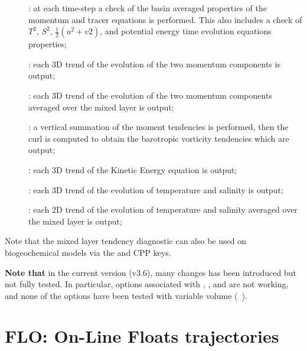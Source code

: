\documentclass[../main/NEMO_manual]{subfiles}
\begin{document}
\begin{description}
\item [{}]: at each  time-step a check of the basin averaged properties of
  the momentum and tracer equations is performed.
  This also includes a check of $T^2$, $S^2$, $\tfrac{1}{2} (u^2+v2)$,
  and potential energy time evolution equations properties;
\item [{}]: each 3D trend of the evolution of the two momentum components is output;
\item [{}]: each 3D trend of the evolution of the two momentum components averaged over the mixed layer is output;
\item [{}]: a vertical summation of the moment tendencies is performed,
  then the curl is computed to obtain the barotropic vorticity tendencies which are output;
\item [{}]  : each 3D trend of the Kinetic Energy equation is output;
\item [{}]: each 3D trend of the evolution of temperature and salinity is output;
\item [{}]: each 2D trend of the evolution of temperature and salinity averaged over the mixed layer is output;
\end{description}

Note that the mixed layer tendency diagnostic can also be used on biogeochemical models via
the  and  CPP keys.

\textbf{Note that} in the current version (v3.6), many changes has been introduced but not fully tested.
In particular, options associated with , , and  are not working,
and none of the options have been tested with variable volume (\ie\ ).

\section[FLO: On-Line Floats trajectories]{FLO: On-Line Floats trajectories}
\label{sec:DIA_FLO}

\begin{listing}
  \caption{}
  \label{lst:namflo}
\end{listing}
\end{document}
